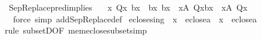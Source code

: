 \begin{isabellebody}
\endisatagproof
{\isafoldproof}%
%
\isadelimproof
\isanewline
%
\endisadelimproof
\isanewline
{}\isamarkupfalse%
\ SepReplace{\isacharunderscore}{\kern0pt}pred{\isacharunderscore}{\kern0pt}implies\ {\isacharcolon}{\kern0pt}\isanewline
\ \ {\isachardoublequoteopen}{\isasymforall}x{\isachardot}{\kern0pt}\ Q{\isacharparenleft}{\kern0pt}x{\isacharparenright}{\kern0pt}{\isasymlongrightarrow}\ b{\isacharparenleft}{\kern0pt}x{\isacharparenright}{\kern0pt}\ {\isacharequal}{\kern0pt}\ b{\isacharprime}{\kern0pt}{\isacharparenleft}{\kern0pt}x{\isacharparenright}{\kern0pt}{\isasymLongrightarrow}\ {\isacharbraceleft}{\kern0pt}b{\isacharparenleft}{\kern0pt}x{\isacharparenright}{\kern0pt}\ {\isachardot}{\kern0pt}{\isachardot}{\kern0pt}\ x{\isasymin}A{\isacharcomma}{\kern0pt}\ Q{\isacharparenleft}{\kern0pt}x{\isacharparenright}{\kern0pt}{\isacharbraceright}{\kern0pt}{\isacharequal}{\kern0pt}{\isacharbraceleft}{\kern0pt}b{\isacharprime}{\kern0pt}{\isacharparenleft}{\kern0pt}x{\isacharparenright}{\kern0pt}\ {\isachardot}{\kern0pt}{\isachardot}{\kern0pt}\ x{\isasymin}A{\isacharcomma}{\kern0pt}\ Q{\isacharparenleft}{\kern0pt}x{\isacharparenright}{\kern0pt}{\isacharbraceright}{\kern0pt}{\isachardoublequoteclose}\isanewline
%
\isadelimproof
\ \ %
\endisadelimproof
%
\isatagproof
{}\isamarkupfalse%
\ \ {\isacharparenleft}{\kern0pt}force\ simp\ add{\isacharcolon}{\kern0pt}SepReplace{\isacharunderscore}{\kern0pt}def{\isacharparenright}{\kern0pt}%
\endisatagproof
{\isafoldproof}%
%
\isadelimproof
%
\endisadelimproof
%
\isadelimdocument
%
\endisadelimdocument
%
\isatagdocument
%
\isamarkuptrue%
%
\endisatagdocument
{\isafolddocument}%
%
\isadelimdocument
%
\endisadelimdocument
{}\isamarkupfalse%
\ eclose{\isacharunderscore}{\kern0pt}sing\ {\isacharcolon}{\kern0pt}\ {\isachardoublequoteopen}x\ {\isasymin}\ eclose{\isacharparenleft}{\kern0pt}a{\isacharparenright}{\kern0pt}\ {\isasymLongrightarrow}\ x\ {\isasymin}\ eclose{\isacharparenleft}{\kern0pt}{\isacharbraceleft}{\kern0pt}a{\isacharbraceright}{\kern0pt}{\isacharparenright}{\kern0pt}{\isachardoublequoteclose}\isanewline
%
\isadelimproof
\ \ %
\endisadelimproof
%
\isatagproof
{}\isamarkupfalse%
{\isacharparenleft}{\kern0pt}rule\ subsetD{\isacharbrackleft}{\kern0pt}OF\ mem{\isacharunderscore}{\kern0pt}eclose{\isacharunderscore}{\kern0pt}subset{\isacharbrackright}{\kern0pt}{\isacharcomma}{\kern0pt}simp{\isacharplus}{\kern0pt}{\isacharparenright}{\kern0pt}%
\endisatagproof
{\isafoldproof}%
%
\isadelimproof
\isanewline

\end{isabellebody}
